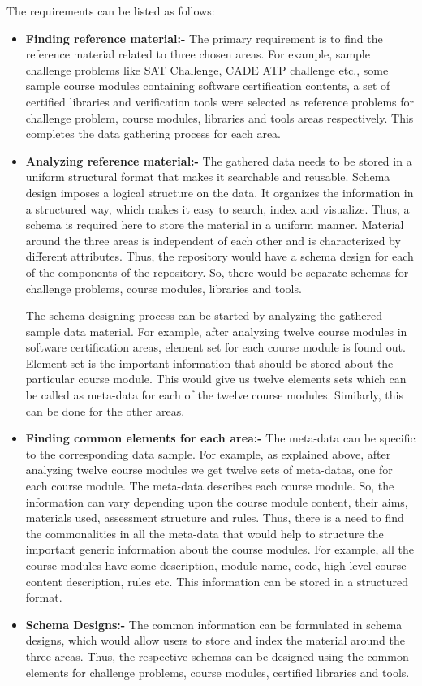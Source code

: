 \documentclass[11pt,letterpaper]{report}
\begin{document}
\noindent The requirements can be listed as follows: 
\begin{itemize}
\item \textbf{Finding reference material:- } The primary requirement is to find the reference material related to three chosen areas. For example, sample challenge problems like SAT Challenge, CADE ATP challenge etc., some sample course modules containing software certification contents, a set of certified libraries and verification tools were selected as reference problems for challenge problem, course modules, libraries and tools areas respectively. This completes the data gathering process for each area. 
\item \textbf{Analyzing reference material:- } The gathered data needs to be stored in a uniform structural format that makes it searchable and reusable. Schema design imposes a logical structure on the data. It organizes the information in a structured way, which makes it easy to search, index and visualize. Thus, a schema is required here to store the material in a uniform manner. Material around the three areas is independent of each other and is characterized by different attributes. Thus, the repository would have a schema design for each of the components of the repository. So, there would be separate schemas for challenge problems, course modules, libraries and tools. 

The schema designing process can be started by analyzing the gathered sample data material. For example, after analyzing twelve course modules in software certification areas, element set for each course module is found out. Element set is the important information that should be stored about the particular course module. This would give us twelve elements sets which can be called as meta-data for each of the twelve course modules. Similarly, this can be done for the other areas. 
\item \textbf{Finding common elements for each area:- } The meta-data can be specific to the corresponding data sample. For example, as explained above, after analyzing twelve course modules we get twelve sets of meta-datas, one for each course module. The meta-data describes each course module. So, the information can vary depending upon the course module content, their aims, materials used, assessment structure and rules. Thus, there is a need to find the commonalities in all the meta-data that would help to structure the important generic information about the course modules. For example, all the course modules have some description, module name, code, high level course content description, rules etc. This information can be stored in a structured format. 
\item \textbf{Schema Designs:- } The common information can be formulated in schema designs, which would allow users to store and index the material around the three areas. Thus, the respective schemas can be designed using the common elements for challenge problems, course modules, certified libraries and tools.     
\end{itemize} 
\end{document}
